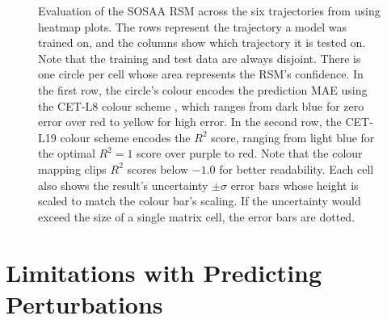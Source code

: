 \begin{figure}[H]
    \caption[Evaluation of the SOSAA RSM across Six Trajectories]{Evaluation of the SOSAA RSM across the six trajectories from  using heatmap plots. The rows represent the trajectory a model was trained on, and the columns show which trajectory it is tested on. Note that the training and test data are always disjoint. There is one circle per cell whose area represents the RSM's confidence. In the first row, the circle's colour encodes the prediction MAE using the CET-L8 colour scheme \cite{color-cet-2015, color-cet-2023}, which ranges from dark blue for zero error over red to yellow for high error. In the second row, the CET-L19 colour scheme \cite{color-cet-2015, color-cet-2023} encodes the $R^2$ score, ranging from light blue for the optimal $R^2 = 1$ score over purple to red. Note that the colour mapping clips $R^2$ scores below $-1.0$ for better readability. Each cell also shows the result's uncertainty $\pm \sigma$ error bars whose height is scaled to match the colour bar's scaling. If the uncertainty would exceed the size of a single matrix cell, the error bars are dotted.}
    \label{fig:sosaa-rsm-trajectories}
\end{figure}

\section{Limitations with Predicting Perturbations} \label{txt:perturbation-generalisation}

